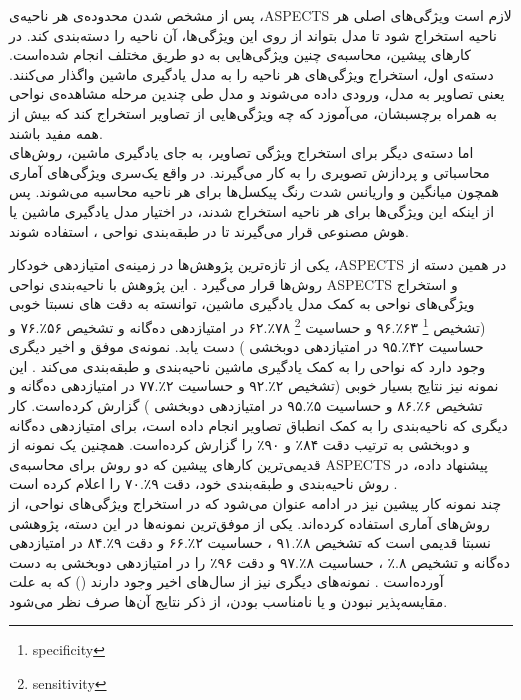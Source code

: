 پس از مشخص شدن محدوده‌ی هر ناحیه‌ی ،ASPECTS لازم است ویژگی‌های اصلی هر ناحیه استخراج شود تا مدل بتواند از روی این ویژگی‌ها، آن ناحیه را دسته‌بندی کند.
در کارهای پیشین، محاسبه‌ی چنین ویژگی‌هایی به دو طریق مختلف انجام شده‌است.
دسته‌ی اول، استخراج ویژگی‌های هر ناحیه را به مدل یادگیری ماشین واگذار می‌کنند.
یعنی تصاویر به مدل، ورودی داده می‌شوند و مدل طی چندین مرحله مشاهده‌ی نواحی به همراه برچسبشان، می‌آموزد که چه ویژگی‌هایی از تصاویر استخراج کند که بیش از همه مفید باشند.\\

اما دسته‌ی دیگر برای استخراج ویژگی تصاویر، به جای یادگیری ماشین، روش‌های محاسباتی و پردازش تصویری را به کار می‌گیرند.
در واقع یک‌سری ویژگی‌های آماری همچون میانگین و واریانس شدت رنگ پیکسل‌ها برای هر ناحیه محاسبه می‌شوند.
پس از اینکه این ویژگی‌ها برای هر ناحیه استخراج شدند، 
در اختیار مدل یادگیری ماشین یا هوش مصنوعی قرار می‌گیرند
تا 
در طبقه‌بندی نواحی ، استفاده شوند.

یکی از تازه‌ترین پژوهش‌ها در زمینه‌ی امتیاز‌دهی خودکار ،ASPECTS در همین دسته‌ از روش‌ها قرار می‌گیرد \cite{lee2023clinical}.
این پژوهش با ناحیه‌بندی نواحی ASPECTS و استخراج ویژگی‌های نواحی به کمک مدل یادگیری ماشین، توانسته به دقت های نسبتا خوبی 
(تشخیص
\footnote{specificity}
۶۳٪.۹۶
و
حساسیت
\footnote{sensitivity}
۷۸٪.۶۲
در امتیازدهی ده‌گانه و 
تشخیص
۵۶٪.۷۶
و
حساسیت
۴۲٪.۹۵
در امتیازدهی دوبخشی 
)
دست یابد.
نمونه‌ی موفق و اخیر دیگری وجود دارد که نواحی را به کمک یادگیری ماشین ناحیه‌بندی و طبقه‌بندی می‌کند \cite{cao2022deep}.
این نمونه نیز نتایج بسیار خوبی 
(تشخیص
۲٪.۹۲
و
حساسیت
۲٪.۷۷
در امتیازدهی ده‌گانه و 
تشخیص
۶٪.۸۶
و
حساسیت
۵٪.۹۵
در امتیازدهی دوبخشی 
)
گزارش کرده‌است.
کار دیگری
\cite{kuang2021eis}
که ناحیه‌بندی را به کمک انطباق تصاویر انجام داده است،
برای امتیازدهی ده‌گانه و دو‌بخشی به ترتیب دقت
۸۴٪ 
و 
۹۰٪ 
را گزارش کرده‌است.
همچنین یک نمونه از قدیمی‌ترین کار‌های پیشین که دو روش برای محاسبه‌ی ASPECTS پیشنهاد داده، در روش ناحیه‌بندی و طبقه‌بندی خود،  
دقت
۹٪.۷۰
را اعلام کرده است \cite{jung2018evaluating}.
\\

چند نمونه کار پیشین نیز در ادامه عنوان می‌شود که در استخراج ویژگی‌های نواحی، از روش‌های آماری استفاده کرده‌اند.
یکی از موفق‌ترین نمونه‌ها در این دسته، پژوهشی نسبتا قدیمی است که
تشخیص
۸٪.۹۱
،
حساسیت
۲٪.۶۶
و دقت 
۹٪.۸۴
در امتیازدهی ده‌گانه و 
تشخیص
۸.٪
،
حساسیت
۸٪.۹۷
و دقت 
۹۶٪
را
در امتیازدهی دوبخشی 
به دست آورده‌است \cite{kuang2019automated}.
نمونه‌های دیگری نیز از سال‌های اخیر وجود دارند
(\cite{liu2021deep,yu2021automated})
که به علت مقایسه‌پذیر نبودن و یا نامناسب بودن، از ذکر نتایج آن‌ها صرف نظر می‌شود.

